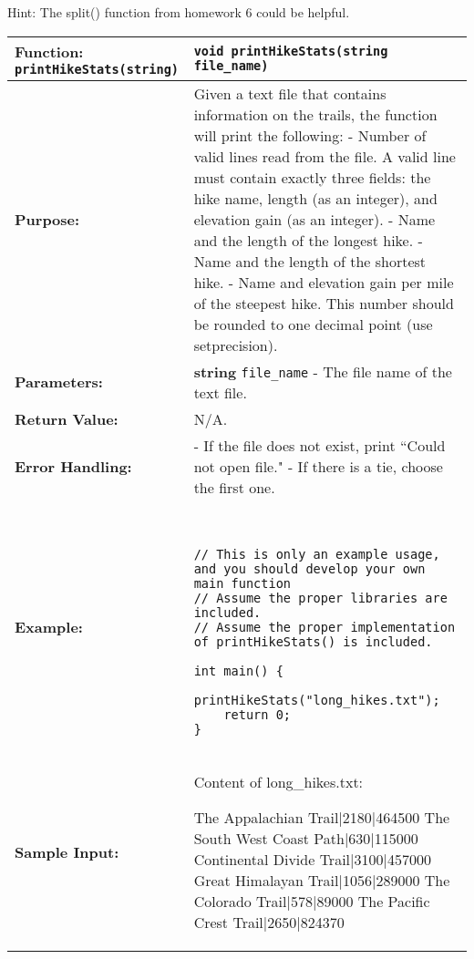 Hint: The split() function from homework 6 could be helpful. 

\begin{longtable}{|p{1.7in}|p{4.3in}|}
\hline
\textbf{Function:}  \texttt{printHikeStats(string)} 
& \texttt{void printHikeStats(string file_name)} \\ \hline

\textbf{Purpose:} & Given a text file that contains information on the trails, the function will print the following: \newline
- Number of valid lines read from the file. A valid line must contain exactly three fields: the hike name, length (as an integer), and elevation gain (as an integer). \newline
- Name and the length of the longest hike. \newline
- Name and the length of the shortest hike. \newline
- Name and elevation gain per mile of the steepest hike. This number should be rounded to one decimal point (use setprecision). 
\\ \hline

\textbf{Parameters:} & 
\textbf{string} \texttt{file\_name} - The file name of the text file. 
\\ \hline

\textbf{Return Value:} & 
N/A. \\ \hline

\textbf{Error Handling:} & 
- If the file does not exist, print ``Could not open file." \newline
- If there is a tie, choose the first one. 
\\ \hline

\textbf{Example:} & 
\begin{example}
\begin{verbatim}


// This is only an example usage, and you should develop your own main function
// Assume the proper libraries are included.
// Assume the proper implementation of printHikeStats() is included.

int main() {
    printHikeStats("long_hikes.txt");
    return 0;
}
\end{verbatim}
\end{example}
\\ \hline

\textbf{Sample Input:} & 
Content of long\_hikes.txt:

\begin{tcolorbox}[colframe=blue, colback=white, boxrule=0.5mm, arc=5mm]
The Appalachian Trail|2180|464500 \newline
The South West Coast Path|630|115000 \newline
Continental Divide Trail|3100|457000 \newline
Great Himalayan Trail|1056|289000 \newline
The Colorado Trail|578|89000 \newline
The Pacific Crest Trail|2650|824370 
\end{tcolorbox}
\\ \hline


\end{longtable}
